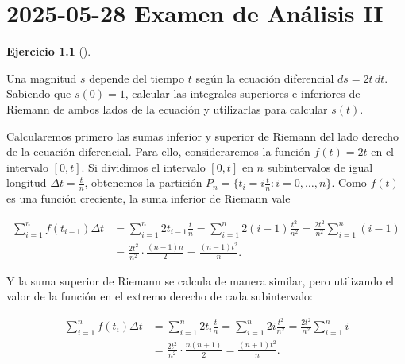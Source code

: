 \documentclass[
  spanish,
  a4paper,
]{scrreport}
\theoremstyle{definition}
\newtheorem{exercise}{Ejercicio}[chapter]
\theoremstyle{remark}
\begin{document}
\chapter{\texorpdfstring{2025-05-28 Examen de Análisis
II}{2025-05-28  Examen de Análisis II}}\label{examen-de-anuxe1lisis-ii-5}

\begin{exercise}[]\protect\hypertarget{exr-1}{}\label{exr-1}

Una magnitud \(s\) depende del tiempo \(t\) según la ecuación
diferencial \(ds = 2t\,dt\). Sabiendo que \(s(0) = 1\), calcular las
integrales superiores e inferiores de Riemann de ambos lados de la
ecuación y utilizarlas para calcular \(s(t)\).

\end{exercise}

\begin{tcolorbox}[enhanced jigsaw, arc=.35mm, bottomrule=.15mm, bottomtitle=1mm, breakable, colback=white, colbacktitle=quarto-callout-tip-color!10!white, colframe=quarto-callout-tip-color-frame, coltitle=black, left=2mm, leftrule=.75mm, opacityback=0, opacitybacktitle=0.6, rightrule=.15mm, title=\textcolor{quarto-callout-tip-color}{\faLightbulb}\hspace{0.5em}{Solución}, titlerule=0mm, toprule=.15mm, toptitle=1mm]

Calcularemos primero las sumas inferior y superior de Riemann del lado
derecho de la ecuación diferencial. Para ello, consideraremos la función
\(f(t) = 2t\) en el intervalo \([0,t]\). Si dividimos el intervalo
\([0,t]\) en \(n\) subintervalos de igual longitud
\(\Delta t = \frac{t}{n}\), obtenemos la partición
\(P_n = \{t_i = i\frac{t}{n}: i = 0, \ldots, n\}\). Como \(f(t)\) es una
función creciente, la suma inferior de Riemann vale

\begin{align*}
\sum_{i=1}^{n} f(t_{i-1}) \Delta t 
&= \sum_{i=1}^{n} 2t_{i-1} \frac{t}{n}
= \sum_{i=1}^{n} 2(i-1)\frac{t^2}{n^2}
= \frac{2t^2}{n^2} \sum_{i=1}^{n} (i-1) \\
&= \frac{2t^2}{n^2} \cdot \frac{(n-1)n}{2} 
= \frac{(n-1)t^2}{n}.
\end{align*}

Y la suma superior de Riemann se calcula de manera similar, pero
utilizando el valor de la función en el extremo derecho de cada
subintervalo:

\begin{align*}
\sum_{i=1}^{n} f(t_i) \Delta t
&= \sum_{i=1}^{n} 2t_i \frac{t}{n} 
= \sum_{i=1}^{n} 2i\frac{t^2}{n^2} 
= \frac{2t^2}{n^2} \sum_{i=1}^{n} i \\
&= \frac{2t^2}{n^2} \cdot \frac{n(n+1)}{2} 
= \frac{(n+1)t^2}{n}.
\end{align*}


\end{tcolorbox}
\end{document}
